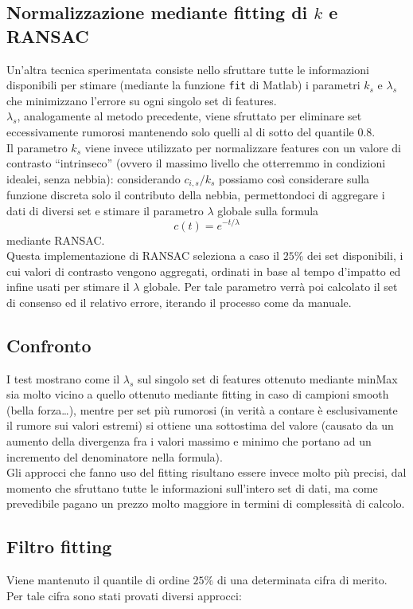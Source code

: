 \documentclass[12pt]{report}
\begin{document}
\subsection{Normalizzazione mediante fitting di $k$ e RANSAC}
\noindent Un'altra tecnica sperimentata consiste nello sfruttare tutte le informazioni disponibili  per stimare (mediante la funzione \verb|fit| di Matlab) i parametri $k_s$ e $\lambda_s$ che minimizzano l'errore su ogni singolo set di features.\\
$\lambda_s$, analogamente al metodo precedente, viene sfruttato per eliminare set eccessivamente rumorosi mantenendo solo quelli al di sotto del quantile $0.8$.\\
Il parametro $k_s$ viene invece utilizzato per normalizzare features con un valore di contrasto ``intrinseco'' (ovvero il massimo livello che otterremmo in condizioni idealei, senza nebbia): considerando $c_{i,s}/k_s$ possiamo cos\`i considerare sulla funzione discreta solo il contributo della nebbia, permettondoci di aggregare i dati di diversi set e stimare il parametro $\lambda$ globale sulla formula $$ c(t) = e^{-t/\lambda} $$ mediante RANSAC.\\
Questa implementazione di RANSAC seleziona a caso il $25\%$ dei set disponibili, i cui valori di contrasto vengono aggregati, ordinati in base al tempo d'impatto ed infine usati per stimare il $\lambda$ globale. Per tale parametro verrà poi calcolato il set di consenso ed il relativo errore, iterando il processo come da manuale.

\subsection{Confronto}
\noindent I test mostrano come il $\lambda_s$ sul singolo set di features ottenuto mediante minMax sia molto vicino a quello ottenuto mediante fitting in caso di campioni smooth (bella forza\dots), mentre per set pi\`u rumorosi (in verit\`a a contare \`e esclusivamente il rumore sui valori estremi) si ottiene una sottostima del valore (causato da un aumento della divergenza fra i valori massimo e minimo che portano ad un incremento del denominatore nella formula).\\
Gli approcci che fanno uso del fitting risultano essere invece molto pi\`u precisi, dal momento che sfruttano tutte le informazioni sull'intero set di dati, ma come prevedibile pagano un prezzo molto maggiore in termini di complessit\`a di calcolo.

\subsection{Filtro fitting}
\noindent Viene mantenuto il quantile di ordine $25\%$ di una determinata cifra di merito. Per tale cifra sono stati provati diversi approcci:
\end{document}
